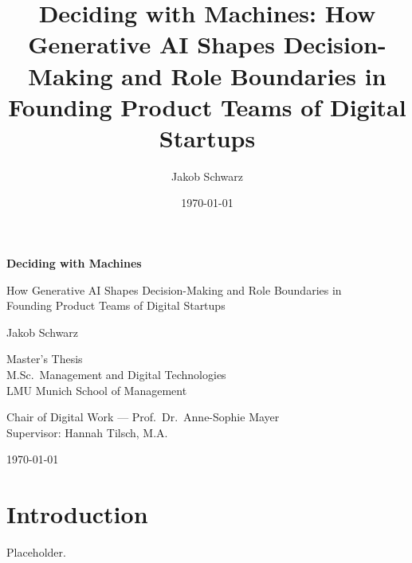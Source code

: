 \documentclass[12pt,a4paper]{report}
\title{Deciding with Machines: How Generative AI Shapes Decision-Making and Role Boundaries in Founding Product Teams of Digital Startups}
\author{Jakob Schwarz}
\date{\today}
\begin{document}
\begin{titlepage}
\centering
\vspace*{2cm}
{\LARGE\bfseries Deciding with Machines\par}
\vspace{0.5cm}
{\large How Generative AI Shapes Decision-Making and Role Boundaries in\\
Founding Product Teams of Digital Startups\par}
\vspace{2cm}
{\large Jakob Schwarz\par}
\vspace{1cm}
{Master's Thesis\\
M.Sc.\ Management and Digital Technologies\\
LMU Munich School of Management\par}
\vspace{1cm}
{Chair of Digital Work --- Prof.\ Dr.\ Anne-Sophie Mayer\\
Supervisor: Hannah Tilsch, M.A.\par}
\vspace{2cm}
{\today\par}
\end{titlepage}

\tableofcontents
\clearpage

% 
% 
% 
% 
% 
% 

\chapter{Introduction}
\label{ch:intro}
Placeholder.

\printbibliography[heading=bibintoc,title={References}]
\end{document}
